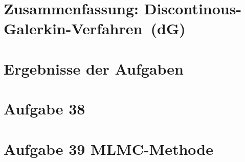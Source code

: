 \documentclass[12pt,a4paper,parskip=half]{scrartcl}
\numberwithin{equation}{section}
\begin{document}


\tableofcontents

\section{Zusammenfassung: Discontinous-Galerkin-Verfahren~(dG) }

\newpage
\section{Ergebnisse der Aufgaben}

\section{Aufgabe 38}

\section{Aufgabe 39  MLMC-Methode}

\end{document}
